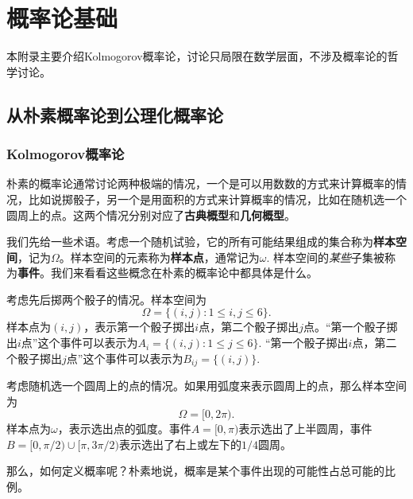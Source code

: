 \chapter{概率论基础}\label{chap:prob}

\begingroup
\newcommand{\B}{\mathscr{B}}
\renewcommand{\F}{\mathscr{F}}
\newcommand{\Exp}{\mathsf{Exp}}
\newcommand{\DExp}{\mathsf{DExp}}
\newcommand{\Lap}{\mathsf{Lap}}

本附录主要介绍Kolmogorov概率论，讨论只局限在数学层面，不涉及概率论的哲学讨论。

\section{从朴素概率论到公理化概率论}

\subsection{Kolmogorov概率论}\label{subsec:kolmogorov-probability}
朴素的概率论通常讨论两种极端的情况，一个是可以用数数的方式来计算概率的情况，比如说掷骰子，另一个是用面积的方式来计算概率的情况，比如在随机选一个圆周上的点。这两个情况分别对应了\textbf{古典概型}和\textbf{几何概型}。

我们先给一些术语。考虑一个随机试验，它的所有可能结果组成的集合称为\textbf{样本空间}，记为$\Omega$。样本空间的元素称为\textbf{样本点}，通常记为$\omega$. 样本空间的\emph{某些}子集被称为\textbf{事件}。我们来看看这些概念在朴素的概率论中都具体是什么。

\begin{example}[古典概型]
考虑先后掷两个骰子的情况。样本空间为
\[
    \Omega = \{ (i, j): 1 \leq i, j \leq 6 \}.
\]
样本点为$(i, j)$，表示第一个骰子掷出$i$点，第二个骰子掷出$j$点。“第一个骰子掷出$i$点”这个事件可以表示为$A_i = \{ (i, j): 1 \leq j \leq 6 \}$. “第一个骰子掷出$i$点，第二个骰子掷出$j$点”这个事件可以表示为$B_{ij} = \{ (i, j) \}$.
\end{example}

\begin{example}[几何概型]
考虑随机选一个圆周上的点的情况。如果用弧度来表示圆周上的点，那么样本空间为
\[
    \Omega = [0, 2\pi).
\]
样本点为$\omega$，表示选出点的弧度。事件$A = [0, \pi)$表示选出了上半圆周，事件$B = [0, \pi/2)\cup[\pi, 3\pi/2)$表示选出了右上或左下的$1/4$圆周。
\end{example}

那么，如何定义概率呢？朴素地说，概率是某个事件出现的可能性占总可能的比例。

